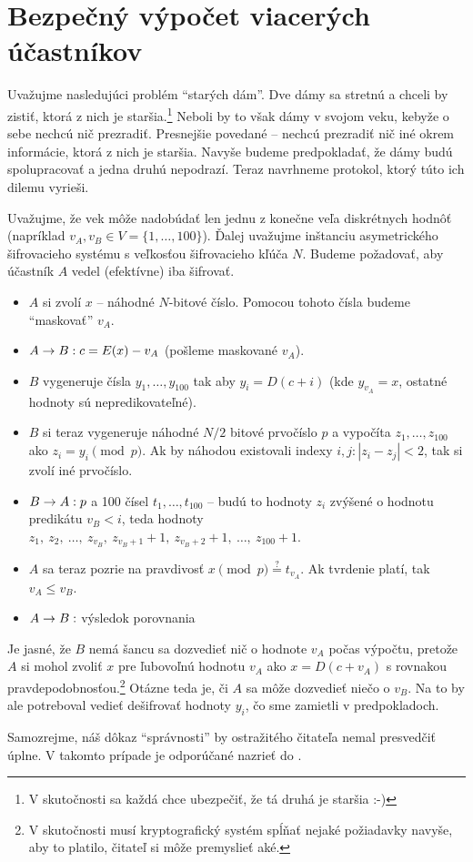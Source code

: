 \section{Bezpečný výpočet viacerých účastníkov}

Uvažujme nasledujúci problém ``starých dám''. Dve dámy sa stretnú a
chceli by zistiť, ktorá z nich je staršia.\footnote{V skutočnosti
sa každá chce ubezpečiť, že tá druhá je staršia :-)}
Neboli by to však dámy v svojom veku, kebyže o sebe nechcú nič prezradiť.
Presnejšie povedané -- nechcú prezradiť nič iné okrem informácie, ktorá z
nich je staršia. Navyše budeme predpokladať, že dámy budú
spolupracovať a jedna druhú nepodrazí.
Teraz navrhneme protokol, ktorý túto ich dilemu vyrieši.

Uvažujme, že vek môže nadobúdať len jednu z konečne veľa diskrétnych
hodnôť (napríklad $v_A,v_B \in V = \{1,\dots,100\}$).
Ďalej uvažujme inštanciu asymetrického šifrovacieho systému s
veľkosťou šifrovacieho kľúča $N$. 
Budeme požadovať, aby účastník $A$ vedel (efektívne) iba šifrovať.

\begin{itemize}
    \compactlist
    \item $A$ si zvolí $x$ -- náhodné $N$-bitové číslo.
        Pomocou tohoto čísla budeme ``maskovať''  $v_A$.
    \item $A \rightarrow B: c = E(x) - v_A $ (pošleme maskované $v_A$).
    \item $B$ vygeneruje čísla $y_1, \dots, y_{100}$ tak aby
            $y_i = D(c + i)$ (kde $y_{v_A} =x$, ostatné hodnoty
            sú nepredikovateľné).
    \item $B$ si teraz vygeneruje náhodné $N/2$ bitové prvočíslo $p$ a
    vypočíta $z_1,\dots,z_{100}$ ako $z_i = y_i \pmod{p}$.
    Ak by náhodou existovali indexy $i,j: |z_i - z_j| < 2$, tak si
    zvolí iné prvočíslo.
    \item $B \rightarrow A:p$ a 100 čísel $t_1, \dots, t_{100}$ --
        budú to hodnoty $z_i$ zvýšené o hodnotu predikátu
        $v_B < i$, teda hodnoty
        $z_1,\ z_2,\ \dots,\ z_{v_B}, \
         z_{v_B+1}+1,\ z_{v_B+2}+1,\ \dots,\ z_{100}+1$.
    \item $A$ sa teraz pozrie na pravdivosť
        $x \pmod{p} \overset{?}{=} t_{v_A}$. Ak tvrdenie platí,
        tak $v_A \le v_B$.
    \item $A \rightarrow B:$ výsledok porovnania
\end{itemize}
Je jasné, že $B$ nemá šancu sa dozvedieť nič o hodnote $v_A$ počas
výpočtu, pretože $A$ si mohol zvoliť $x$ pre ľubovoľnú hodnotu
$v_A$ ako $x=D(c + v_A)$ s rovnakou pravdepodobnosťou.\footnote{V
    skutočnosti musí kryptografický systém spĺňať nejaké požiadavky
    navyše, aby to platilo, čitateľ si môže premyslieť aké.
}
Otázne teda je, či $A$ sa môže dozvedieť niečo o $v_B$.
Na to by ale potreboval vedieť dešifrovať hodnoty $y_i$, čo sme
zamietli v predpokladoch.
\begin{poznamka}
    Samozrejme, náš dôkaz ``správnosti'' by ostražitého čitateľa nemal
    presvedčiť úplne. V takomto prípade je odporúčané nazrieť do
    \cite{yao}.
\end{poznamka}


